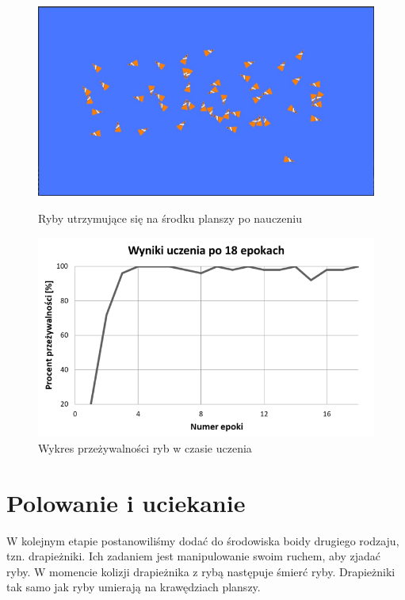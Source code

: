\documentclass{article}
\begin{document}
\begin{figure}[H]
    \begin{minipage}{0.48\textwidth}
        \centering
        \includegraphics[width=\textwidth]{6_Learing_result.jpg}
        \caption{Ryby utrzymujące się na środku planszy po nauczeniu}
    \end{minipage}
    \hspace{0.02\textwidth}
    \begin{minipage}{0.48\textwidth}
        \centering
        \includegraphics[width=\textwidth]{borders_learning_plot.png}
        \caption{Wykres przeżywalności ryb w czasie uczenia}
    \end{minipage}
\end{figure}
\section{Polowanie i uciekanie}
W kolejnym etapie postanowiliśmy dodać do środowiska boidy drugiego rodzaju, tzn. drapieżniki. Ich zadaniem jest manipulowanie swoim ruchem, aby zjadać ryby. W momencie kolizji drapieżnika z rybą następuje śmierć ryby. Drapieżniki tak samo jak ryby umierają na krawędziach planszy.
\end{document}
